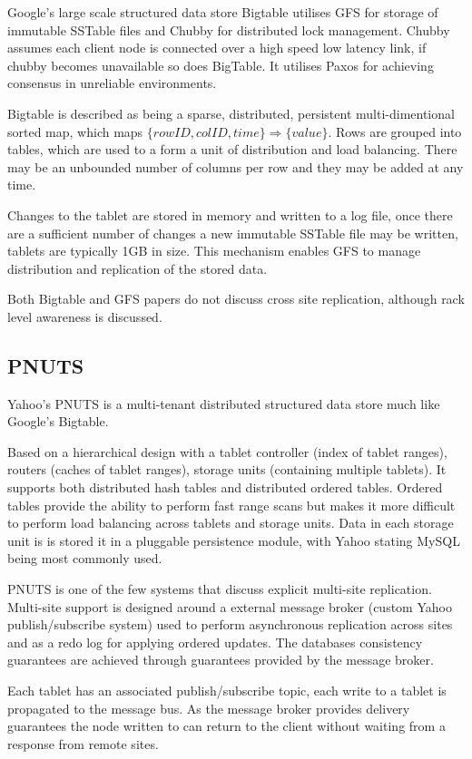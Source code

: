 Google's large scale structured data store Bigtable utilises GFS for storage of immutable SSTable files and Chubby for distributed lock management. Chubby assumes each client node is connected over a high speed low latency link, if chubby becomes unavailable so does BigTable. It utilises Paxos\cite{paxos} for achieving consensus in unreliable environments.

Bigtable is described as being a sparse, distributed, persistent multi-dimentional sorted map, which maps $\{rowID, colID, time\} \Rightarrow \{value\}$. Rows are grouped into tables, which are used to a form a unit of distribution and load balancing. There may be an unbounded number of columns per row and they may be added at any time.

Changes to the tablet are stored in memory and written to a log file, once there are a sufficient number of changes a new immutable SSTable file may be written, tablets are typically 1GB in size. This mechanism enables GFS to manage distribution and replication of the stored data. 

Both Bigtable and GFS papers do not discuss cross site replication, although rack level awareness is discussed.

\subsection{PNUTS}
Yahoo's PNUTS\cite{pnuts, pnutsVid} is a multi-tenant distributed structured data store much like Google’s Bigtable. 

Based on a hierarchical design with a tablet controller (index of tablet ranges), routers (caches of tablet ranges), storage units (containing multiple tablets). It supports both distributed hash tables and distributed ordered tables. Ordered tables provide the ability to perform fast range scans but makes it more difficult to perform load balancing across tablets and storage units. Data in each storage unit is is stored it in a pluggable persistence module, with Yahoo stating MySQL being most commonly used.

PNUTS is one of the few systems that discuss explicit multi-site replication. Multi-site support is designed around a external message broker (custom Yahoo publish/subscribe system) used to perform asynchronous replication across sites and as a redo log for applying ordered updates. The databases consistency guarantees are achieved through guarantees provided by the message broker.

Each tablet has an associated publish/subscribe topic, each write to a tablet is propagated to the message bus. As the message broker provides delivery guarantees the node written to can return to the client without waiting from a response from remote sites.

